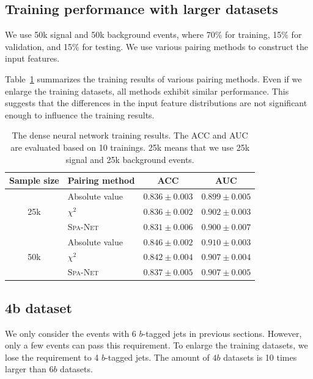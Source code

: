 \documentclass[12pt]{article}
\begin{document}
    \subsection{Training performance with larger datasets}%
    \label{sub:training_performance_with_larger_datasets}
         We use 50k signal and 50k background events, where 70\% for training, 15\% for validation, and 15\% for testing. We use various pairing methods to construct the input features.

        Table~\ref{tab:DNN_training_results_25k_50k} summarizes the training results of various pairing methods. Even if we enlarge the training datasets, all methods exhibit similar performance. This suggests that the differences in the input feature distributions are not significant enough to influence the training results.
        \begin{table}[htpb]
            \centering
            \caption{The dense neural network training results. The ACC and AUC are evaluated based on 10 trainings. 25k means that we use 25k signal and 25k background events.}
            \label{tab:DNN_training_results_25k_50k}
            \begin{tabular}{c|l|cc}
            Sample size          & Pairing method   & ACC               & AUC               \\ \hline
            \multirow{3}{*}{25k} & Absolute value   & $0.836 \pm 0.003$ & $0.899 \pm 0.005$ \\
                                 & $\chi^2$         & $0.836 \pm 0.002$ & $0.902 \pm 0.003$ \\
                                 & \textsc{Spa-Net} & $0.831 \pm 0.006$ & $0.900 \pm 0.007$ \\ \hline
            \multirow{3}{*}{50k} & Absolute value   & $0.846 \pm 0.002$ & $0.910 \pm 0.003$ \\
                                 & $\chi^2$         & $0.842 \pm 0.004$ & $0.907 \pm 0.004$ \\
                                 & \textsc{Spa-Net} & $0.837 \pm 0.005$ & $0.907 \pm 0.005$
            \end{tabular}
        \end{table}
    \subsection{4b dataset}%
    \label{sub:4b_dataset}
        We only consider the events with 6 $b$-tagged jets in previous sections. However, only a few events can pass this requirement. To enlarge the training datasets, we lose the requirement to 4 $b$-tagged jets. The amount of $4b$ datasets is 10 times larger than $6b$ datasets.
\end{document}
